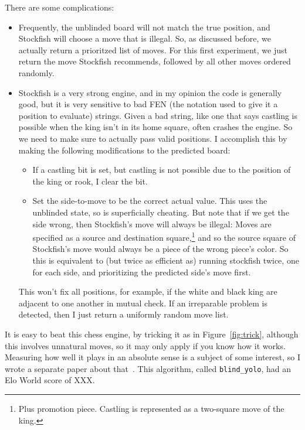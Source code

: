 \documentclass[twocolumn]{amsart}
\begin{document}
There are some complications:
\begin{itemize}
\item Frequently, the unblinded board will not match the true
  position, and Stockfish will choose a move that is illegal. So, as discussed
  before, we actually return a prioritzed list of moves. For this first
  experiment, we just return the move Stockfish recommends, followed by all
  other moves ordered randomly.
\item Stockfish is a very strong engine, and in my opinion the code is generally
  good, but it is very sensitive to bad FEN (the notation used to give it a
  position to evaluate) strings. Given a bad string, like one that says castling
  is possible when the king isn't in its home square, often crashes the engine.
  So we need to make sure to actually pass valid positions. I accomplish this
  by making the following modifications to the predicted board:
  \begin{itemize}
  \item If a castling bit is set, but castling is not possible due to the position
    of the king or rook, I clear the bit.
  \item Set the side-to-move to be the correct actual value. This uses
    the unblinded state, so is superficially cheating. But note that
    if we get the side wrong, then Stockfish's move will always be
    illegal: Moves are specified as a source and destination
    square,\footnote{Plus promotion piece. Castling is represented as
      a two-square move of the king.} and so the source square of
    Stockfish's move would always be a piece of the wrong piece's
    color. So this is equivalent to (but twice as efficient as)
    running stockfish twice, one for each side, and prioritizing the
    predicted side's move first.
  \end{itemize}
  This won't fix all positions, for example, if the white and black king are
  adjacent to one another in mutual check. If an irreparable problem is detected,
  then I just return a uniformly random move list.
\end{itemize}

It is easy to beat this chess engine, by tricking it as in
Figure~\ref{fig:trick}, although this involves unnatural moves, so it
may only apply if you know how it works.
Measuring how well it plays in an absolute sense is a subject of some
interest, so I wrote a separate paper about that~\cite{eloworld}. This
algorithm, called \verb+blind_yolo+, had an Elo World score of XXX.
\end{document}

